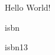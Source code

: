 \documentclass{minimal}
\begin{document}
Hello World!

\gls{isbn}

\gls{isbn13}

\printunsrtglossaries
\end{document}
